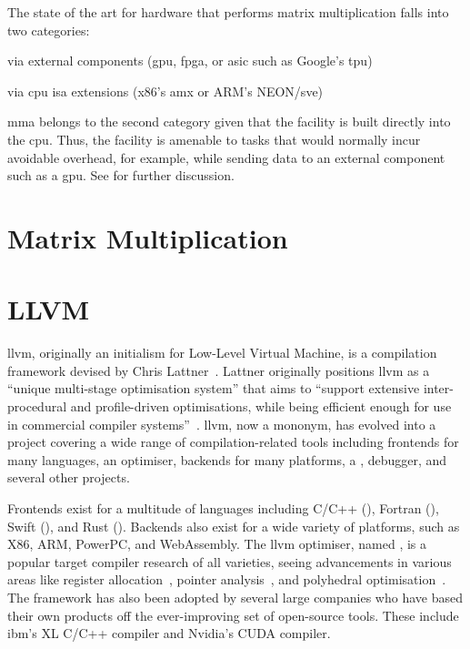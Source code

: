 \documentclass[\main/thesis.tex]{subfiles}
\begin{document}
The state of the art for hardware that performs matrix multiplication falls into two categories:
\begin{enumerate*}[itemjoin*={{ and }}, label=\textbf{(\arabic*)}, after={.}]
  \item via external components (\eg \gls{gpu}, \gls{fpga}, or \gls{asic} such as Google's \gls{tpu})
  \item via \gls{cpu} \gls{isa} extensions (\eg x86's \gls{amx} or ARM's NEON/\gls{sve})
\end{enumerate*}
\Gls{mma} belongs to the second category given that the facility is built directly into the \gls{cpu}.
Thus, the facility is amenable to tasks that would normally incur avoidable overhead, for example, while sending data to an external component such as a \gls{gpu}.
See  for further discussion.

\section{Matrix Multiplication}

\section{LLVM}
\label{sec:llvm}
\Gls{llvm}, originally an initialism for Low-Level Virtual Machine, is a compilation framework devised by Chris Lattner~\autocite{lattner2002llvm,lattner2004llvm}.
Lattner originally positions \gls{llvm} as a ``unique multi-stage optimisation system'' that aims to ``support extensive inter-procedural and profile-driven optimisations, while being efficient enough for use in commercial compiler systems''~\autocite{lattner2002llvm}.
\Gls{llvm}, now a mononym, has evolved into a project covering a wide range of compilation-related tools including frontends for many languages, an optimiser, backends for many platforms, a , debugger, and several other projects.

Frontends exist for a multitude of languages including C/C++ (), Fortran (), Swift (), and Rust ().
Backends also exist for a wide variety of platforms, such as X86, ARM, PowerPC, and WebAssembly.
The \gls{llvm} optimiser, named , is a popular target compiler research of all varieties, seeing advancements in various areas like register allocation~\autocite{lozano2019combinatorial,pereira2008register}, pointer analysis~\autocite{hardekopf2009semi,sui2016interprocedural}, and polyhedral optimisation~\autocite{grosser2011polly,alves2015runtime}.
The framework has also been adopted by several large companies who have based their own products off the ever-improving set of open-source tools.
These include \gls{ibm}'s XL C/C++ compiler and Nvidia's CUDA compiler.
\end{document}
